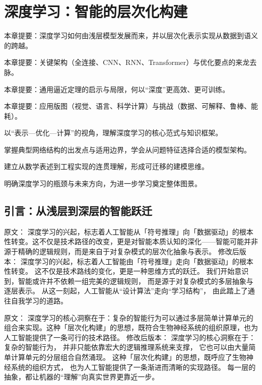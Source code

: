 \chapter{深度学习：智能的层次化构建}

\begin{introduction}
  \item 本章提要：深度学习如何由浅层模型发展而来，并以层次化表示实现从数据到语义的跨越。
  \item 本章提要：关键架构（全连接、CNN、RNN、Transformer）与优化要点的来龙去脉。
  \item 本章提要：通用逼近定理的启示与局限，何以“深度”更高效、更可训练。
  \item 本章提要：应用版图（视觉、语言、科学计算）与挑战（数据、可解释、鲁棒、能耗）。
\end{introduction}

\begin{introduction}
  \item 以“表示—优化—计算”的视角，理解深度学习的核心范式与知识框架。
  \item 掌握典型网络结构的出发点与适用边界，学会从问题特征选择合适的模型架构。
  \item 建立从数学表述到工程实现的连贯理解，形成可迁移的建模思维。
  \item 明确深度学习的瓶颈与未来方向，为进一步学习奠定整体图景。
\end{introduction}

\section{引言：从浅层到深层的智能跃迁}

原文：
深度学习的兴起，标志着人工智能从「符号推理」向「数据驱动」的根本性转变。这不仅是技术路径的改变，更是对智能本质认知的深化——智能可能并非源于精确的逻辑规则，而是来自于对复杂模式的层次化抽象与表示。
修改后版本：
深度学习的兴起，标志着人工智能由「符号推理」走向「数据驱动」的根本性转变。  
这不仅是技术路线的变化，更是一种思维方式的跃迁。  
我们开始意识到，智能或许并不依赖一组完美的逻辑规则，  
而是源于对复杂模式的多层抽象与逐层表示。  
从这一刻起，人工智能从“设计算法”走向“学习结构”，  
由此踏上了通往自我学习的道路。



原文：
深度学习的核心洞察在于：复杂的智能行为可以通过多层简单计算单元的组合来实现。这种「层次化构建」的思想，既符合生物神经系统的组织原理，也为人工智能提供了一条可行的技术路径。
修改后版本：
深度学习的核心洞察在于：复杂的智能行为，  
并非只能依靠宏大的逻辑推理系统来支撑，  
它也可以由大量简单计算单元的分层组合自然涌现。  
这种「层次化构建」的思想，既呼应了生物神经系统的组织方式，  
也为人工智能提供了一条渐进而清晰的实现路径。  
每一层的抽象，都让机器的“理解”向真实世界更靠近一步。  



